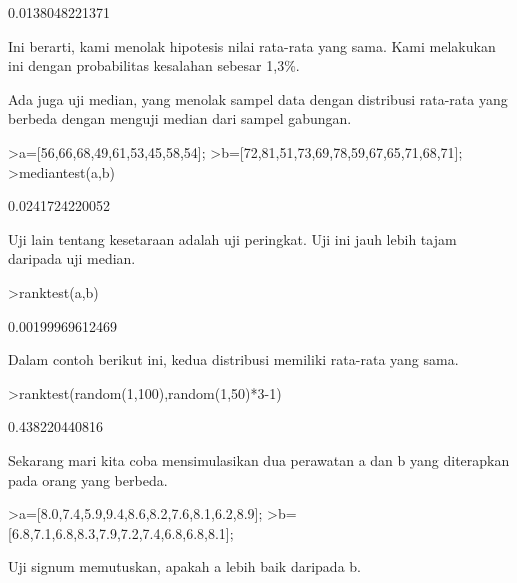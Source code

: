 \documentclass[a4paper,10pt]{article}
\begin{document}
\begin{eulernotebook}
\begin{eulercomment}
\begin{eulercomment}
\begin{eulercomment}
\begin{eulercomment}
\begin{eulercomment}
\begin{eulercomment}
\begin{eulercomment}
\begin{eulercomment}
\begin{eulercomment}
\begin{eulercomment}
\begin{eulercomment}
\begin{eulercomment}
\begin{eulercomment}
\begin{eulercomment}
\begin{eulercomment}
\begin{eulercomment}
\begin{eulercomment}
\begin{eulercomment}
\begin{eulercomment}
\begin{eulercomment}
\begin{euleroutput}
  0.0138048221371
\end{euleroutput}
\begin{eulercomment}
Ini berarti, kami menolak hipotesis nilai rata-rata yang sama. Kami
melakukan ini dengan probabilitas kesalahan sebesar 1,3\%.

Ada juga uji median, yang menolak sampel data dengan distribusi
rata-rata yang berbeda dengan menguji median dari sampel gabungan.
\end{eulercomment}
\begin{eulerprompt}
>a=[56,66,68,49,61,53,45,58,54];
>b=[72,81,51,73,69,78,59,67,65,71,68,71];
>mediantest(a,b)
\end{eulerprompt}
\begin{euleroutput}
  0.0241724220052
\end{euleroutput}
\begin{eulercomment}
Uji lain tentang kesetaraan adalah uji peringkat. Uji ini jauh lebih
tajam daripada uji median.
\end{eulercomment}
\begin{eulerprompt}
>ranktest(a,b)
\end{eulerprompt}
\begin{euleroutput}
  0.00199969612469
\end{euleroutput}
\begin{eulercomment}
Dalam contoh berikut ini, kedua distribusi memiliki rata-rata yang
sama.
\end{eulercomment}
\begin{eulerprompt}
>ranktest(random(1,100),random(1,50)*3-1)
\end{eulerprompt}
\begin{euleroutput}
  0.438220440816
\end{euleroutput}
\begin{eulercomment}
Sekarang mari kita coba mensimulasikan dua perawatan a dan b yang
diterapkan pada orang yang berbeda.
\end{eulercomment}
\begin{eulerprompt}
>a=[8.0,7.4,5.9,9.4,8.6,8.2,7.6,8.1,6.2,8.9];
>b=[6.8,7.1,6.8,8.3,7.9,7.2,7.4,6.8,6.8,8.1];
\end{eulerprompt}
\begin{eulercomment}
Uji signum memutuskan, apakah a lebih baik daripada b.
\end{eulercomment}

\end{eulercomment}
\end{eulercomment}
\end{eulercomment}
\end{eulercomment}
\end{eulercomment}
\end{eulercomment}
\end{eulercomment}
\end{eulercomment}
\end{eulercomment}
\end{eulercomment}
\end{eulercomment}
\end{eulercomment}
\end{eulercomment}
\end{eulercomment}
\end{eulercomment}
\end{eulercomment}
\end{eulercomment}
\end{eulercomment}
\end{eulercomment}
\end{eulercomment}
\end{eulernotebook}
\end{document}
